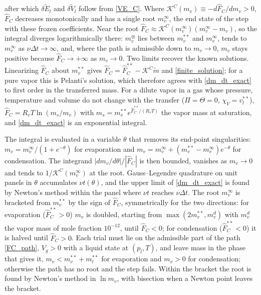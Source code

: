 after which $\delta\tilde{E}_l$ and $\delta\tilde{V}_l$ follow from \eqref{VE_C}. Where $\mathcal{K}^C(m_v)\equiv-d\hat{F}_C/dm_v>0$, $\hat{F}_C$ decreases monotonically and has a single root $m_v^\infty$, the end state of the step with these frozen coefficients. Near the root $\hat{F}_C\approx\mathcal{K}^C(m_v^\infty)(m_v^\infty-m_v)$, so the integral diverges logarithmically there: $m_v^{\otimes}$ lies between $m_v^{**}$ and $m_v^\infty$, tends to $m_v^\infty$ as $\nu\Delta t\to\infty$, and, where the path is admissible down to $m_v\to0$, $m_v$ stays positive because $\hat{F}_C\to+\infty$ as $m_v\to0$. Two limits recover the known solutions. Linearizing $\hat{F}_C$ about $m_v^{**}$ gives $\hat{F}_C=\hat{F}_C^{**}-\mathcal{K}^C\tilde{m}$ and \eqref{finite_solution}; for a pure vapor this is Pelanti's solution, which therefore agrees with \eqref{dm_dt_exact} to first order in the transferred mass. For a dilute vapor in a gas whose pressure, temperature and volume do not change with the transfer ($\Pi=\Theta=0$, $\chi_V=v_l^{**}$), $\hat{F}_C=R_vT\ln(m_s/m_v)$ with $m_s=m_v^{**}e^{\hat{F}_C^{**}/(R_vT)}$ the vapor mass at saturation, and \eqref{dm_dt_exact} is an exponential integral.

The integral is evaluated in a variable $\theta$ that removes its end-point singularities: $m_v=m_v^\infty/(1+e^{-\theta})$ for evaporation and $m_v=m_v^\infty+(m_v^{**}-m_v^\infty)e^{-\theta}$ for condensation. The integrand $|dm_v/d\theta|/|\hat{F}_C|$ is then bounded, vanishes as $m_v\to0$ and tends to $1/\mathcal{K}^C(m_v^\infty)$ at the root. Gauss--Legendre quadrature on unit panels in $\theta$ accumulates $\nu t(\theta)$, and the upper limit of \eqref{dm_dt_exact} is found by Newton's method within the panel where $\nu t$ reaches $\nu\Delta t$. The root $m_v^\infty$ is bracketed from $m_v^{**}$ by the sign of $\hat{F}_C$, symmetrically for the two directions: for evaporation ($\hat{F}_C^{**}>0$) $m_v$ is doubled, starting from $\max(2m_v^{**},m_v^{d})$ with $m_v^{d}$ the vapor mass of mole fraction $10^{-12}$, until $\hat{F}_C<0$; for condensation ($\hat{F}_C^{**}<0$) it is halved until $\hat{F}_C>0$. Each trial must lie on the admissible part of the path \eqref{FC_path}, $V_g>0$ with a liquid state at $(p_l,T)$, and leave mass in the phase that gives it, $m_v<m_v^{**}+m_l^{**}$ for evaporation and $m_v>0$ for condensation; otherwise the path has no root and the step fails. Within the bracket the root is found by Newton's method in $\ln m_v$, with bisection when a Newton point leaves the bracket.

